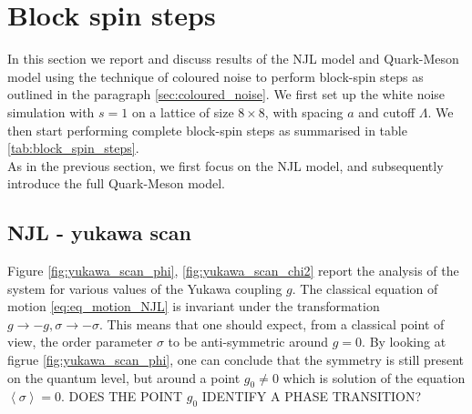 \section{Block spin steps}
In this section we report and discuss results of the NJL model and Quark-Meson model using the technique of coloured noise to perform block-spin steps as outlined in the paragraph \ref{sec:coloured_noise}. We first set up the white noise simulation with $s=1$ on a lattice of size $8 \times 8$, with spacing $a$ and cutoff $\Lambda$. We then start performing complete block-spin steps as summarised in table \ref{tab:block_spin_steps}. \\
As in the previous section, we first focus on the NJL model, and subsequently introduce the full Quark-Meson model.

\subsection{NJL - yukawa scan}
Figure \ref{fig:yukawa_scan_phi}, \ref{fig:yukawa_scan_chi2} report the analysis of the system for various values of the Yukawa coupling $g$. The classical equation of motion \eqref{eq:eq_motion_NJL} is invariant under the transformation $g \to -g, \sigma \to -\sigma$. This means that one should expect, from a classical point of view, the order parameter $\sigma$ to be anti-symmetric around $g = 0$. By looking at figrue \ref{fig:yukawa_scan_phi}, one can conclude that the symmetry is still present on the quantum level, but around a point $g_0 \neq 0$ which is solution of the equation $\left\langle \sigma \right\rangle = 0$. DOES THE POINT $g_0$ IDENTIFY A PHASE TRANSITION?


